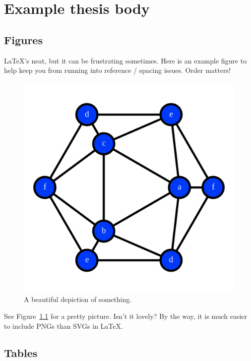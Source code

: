 
\chapter{Example thesis body}

  \section{Figures}

    LaTeX's neat, but it can be frustrating sometimes. Here is an example figure to help keep you from running into reference / spacing issues. Order matters!

    \begin{figure}
      \centering%
      \includegraphics[scale=0.35]{res/images/pretty_picture.png}%
      \caption{A beautiful depiction of something.}%
      \label{fig:pretty_picture}
    \end{figure}

    See Figure~\ref{fig:pretty_picture} for a pretty picture. Isn't it lovely? By the way, it is much easier to include PNGs than SVGs in LaTeX. 


  \section{Tables}

